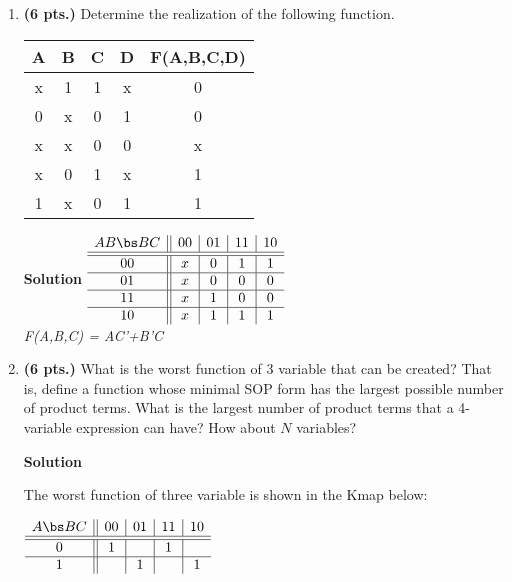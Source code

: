 \begin{enumerate}
    \item \textbf{ (6 pts.)} Determine the \SOPmin realization of the following
        function.

        \begin{tabular}{c|c|c|c||c}
            A & B & C & D & F(A,B,C,D) \\ \hline
            x & 1 & 1 & x & 0 \\ \hline
            0 & x & 0 & 1 & 0 \\ \hline
            x & x & 0 & 0 & x \\ \hline
            x & 0 & 1 & x & 1 \\ \hline
            1 & x & 0 & 1 & 1 \\
        \end{tabular}

        \begin{onlysolution}  \textbf{Solution} \itshape{
                $
                \begin{array} {c||c|c|c|c}
                    A B \bs B C   & 00 & 01 & 11 & 10 \\ \hline \hline
                    00        & x  & 0  & 1  & 1  \\ \hline
                    01        & x  & 0  & 0  & 0  \\ \hline
                    11        & x  & 1  & 0  & 0  \\ \hline
                    10        & x  & 1  & 1  & 1  \\
                \end{array}$  \\
                F(A,B,C) = AC'+B'C
            }
        \end{onlysolution}

    \item \textbf{ (6 pts.)} What is the worst function \SOPmin of 3 variable
        that can be created?  That is, define a function whose minimal SOP form
        has the largest possible number of product terms.  What is the largest
        number of product terms that a 4-variable \SOPmin expression can
        have?  How about $N$ variables?

        \begin{onlysolution}  \textbf{Solution} \itshape{
                The worst function of three variable is shown in the Kmap below:

                $
                \begin{array} {c||c|c|c|c}
                    A \bs B C   & 00 & 01 & 11 & 10 \\ \hline \hline
                    0        & 1  &    & 1  &    \\ \hline
                    1        &    & 1  &    & 1  \\
                \end{array}$

}
\end{onlysolution}
\end{enumerate}
